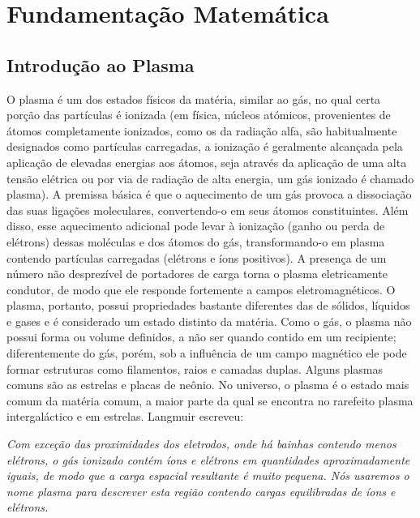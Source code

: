 \documentclass[12pt,oneside,a4paper]{abntex2}
\theoremstyle{definition}  %
\begin{document}
\chapter{Fundamentação Matemática}
\section{Introdução ao Plasma}
O plasma é um dos estados físicos da matéria, similar ao gás, no qual certa porção das partículas é ionizada
 (em física, núcleos atómicos, provenientes de átomos completamente ionizados, como os da radiação alfa, são habitualmente designados como partículas carregadas, a ionização é geralmente alcançada pela aplicação de elevadas energias aos átomos, seja através da aplicação de uma alta tensão elétrica ou por via de radiação de alta energia, um gás ionizado é chamado plasma).
 A premissa básica é que o aquecimento de um gás provoca a dissociação das suas ligações moleculares, convertendo-o em seus átomos constituintes. Além disso, esse aquecimento adicional pode levar à ionização (ganho ou perda de elétrons) dessas moléculas e dos átomos do gás, transformando-o em plasma contendo partículas carregadas (elétrons e íons positivos).
A presença de um número não desprezível de portadores de carga torna o plasma eletricamente condutor, de modo que ele responde fortemente a campos eletromagnéticos. O plasma, portanto, possui propriedades bastante diferentes das de sólidos, líquidos e gases e é considerado um estado distinto da matéria. Como o gás, o plasma não possui forma ou volume definidos, a não ser quando contido em um recipiente; diferentemente do gás, porém, sob a influência de um campo magnético ele pode formar estruturas como filamentos, raios e camadas duplas. Alguns plasmas comuns são as estrelas e placas de neônio. No universo, o plasma é o estado mais comum da matéria comum, a maior parte da qual se encontra no rarefeito plasma intergaláctico e em estrelas.
 Langmuir escreveu:

\begin{center}
\textit{    Com exceção das proximidades dos eletrodos, onde há bainhas contendo menos elétrons, o gás ionizado contém íons e elétrons em quantidades aproximadamente iguais, de modo que a carga espacial resultante é muito pequena. Nós usaremos o nome plasma para descrever esta região contendo cargas equilibradas de íons e elétrons.}
\end{center}
\end{document}
